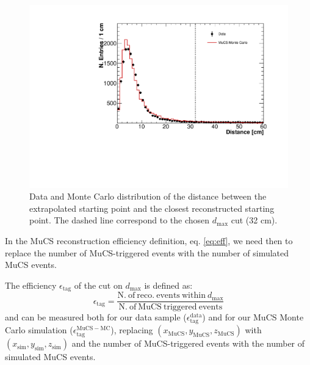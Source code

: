 \documentclass[a4paper]{scrartcl}
\begin{document}
\begin{figure}[htbp]
  \begin{center}
    \includegraphics[width=0.7\linewidth]{figures/dist.pdf}
    \caption{Data and Monte Carlo distribution of the distance between the extrapolated starting point and the closest reconstructed starting point. The dashed line correspond to the chosen $d_{\mathrm{max}}$ cut (32 cm).} \label{fig:dist}
  \end{center}
\end{figure}

In the MuCS reconstruction efficiency definition, eq. \eqref{eq:eff}, we need then to replace the number of MuCS-triggered events with the number of simulated MuCS events.

The efficiency $\epsilon_{\mathrm{tag}}$ of the cut on $d_{\mathrm{max}}$ is defined as:
\begin{equation}
  \epsilon_{\mathrm{tag}}=\frac{\mathrm{N.~of~reco.~events~within~}d_{\mathrm{max}}}{\mathrm{N.~of~MuCS~triggered~events}}
\end{equation}
and can be measured both for our data sample ($\epsilon^{\mathrm{data}}_{\mathrm{tag}}$) and for our MuCS Monte Carlo simulation ($\epsilon^{\mathrm{MuCS-MC}}_{\mathrm{tag}}$), replacing $(x_{\mathrm{MuCS}},y_{\mathrm{MuCS}},z_{\mathrm{MuCS}})$ with $(x_{\mathrm{sim}},y_{\mathrm{sim}},z_{\mathrm{sim}})$ and the number of MuCS-triggered events with the number of simulated MuCS events.
\end{document}
